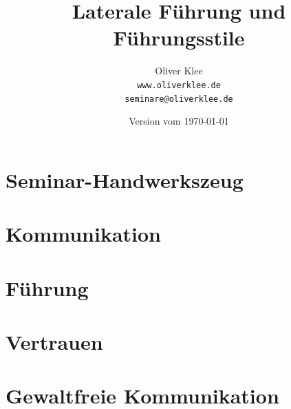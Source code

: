 \documentclass[a4paper,openany,twoside,titlepage,10pt,headsepline]{scrbook}
\title{Laterale Führung und Führungsstile}
\author{Oliver Klee\\\texttt{www.oliverklee.de}\\\texttt{seminare@oliverklee.de}}
\date{Version vom \today}
\begin{document}
    \frontmatter

    \maketitle

    \tableofcontents


    \mainmatter


    \chapter{Seminar-Handwerkszeug}
    
    
    


    \chapter{Kommunikation}
    
    
    
    
    
    


    \chapter{Führung}
    
    
    
    
    
    
    
    
    
    
    
    
    


    \chapter{Vertrauen}
    
    


    \chapter{Gewaltfreie Kommunikation}
    
    
    
    

    \backmatter

    

    

    \printindex
\end{document}
